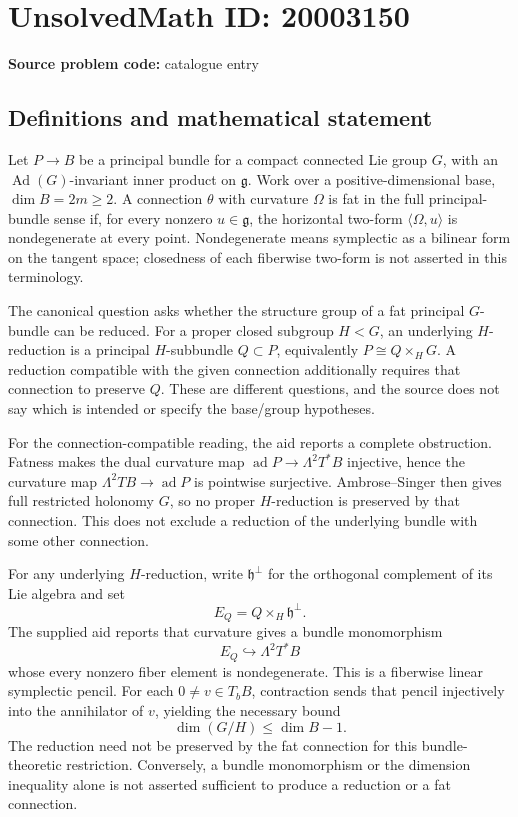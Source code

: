 \documentclass[11pt]{article}
\begin{document}
\section*{UnsolvedMath ID: 20003150}
\textbf{Source problem code:} catalogue entry
\subsection{Definitions and mathematical statement}
Let $P\to B$ be a principal bundle for a compact connected Lie group $G$, with an $\operatorname{Ad}(G)$-invariant inner product on $\mathfrak g$. Work over a positive-dimensional base, $\dim B=2m\geq2$. A connection $\theta$ with curvature $\Omega$ is fat in the full principal-bundle sense if, for every nonzero $u\in\mathfrak g$, the horizontal two-form $\langle\Omega,u\rangle$ is nondegenerate at every point. Nondegenerate means symplectic as a bilinear form on the tangent space; closedness of each fiberwise two-form is not asserted in this terminology.

The canonical question asks whether the structure group of a fat principal $G$-bundle can be reduced. For a proper closed subgroup $H<G$, an underlying $H$-reduction is a principal $H$-subbundle $Q\subset P$, equivalently $P\cong Q\times_HG$. A reduction compatible with the given connection additionally requires that connection to preserve $Q$. These are different questions, and the source does not say which is intended or specify the base/group hypotheses.

For the connection-compatible reading, the aid reports a complete obstruction. Fatness makes the dual curvature map $\operatorname{ad}P\to\Lambda^2T^*B$ injective, hence the curvature map $\Lambda^2TB\to\operatorname{ad}P$ is pointwise surjective. Ambrose--Singer then gives full restricted holonomy $G$, so no proper $H$-reduction is preserved by that connection. This does not exclude a reduction of the underlying bundle with some other connection.

For any underlying $H$-reduction, write $\mathfrak h^\perp$ for the orthogonal complement of its Lie algebra and set
\[
 E_Q=Q\times_H\mathfrak h^\perp.
\]
The supplied aid reports that curvature gives a bundle monomorphism
\[
 E_Q\hookrightarrow\Lambda^2T^*B
\]
whose every nonzero fiber element is nondegenerate. This is a fiberwise linear symplectic pencil. For each $0\ne v\in T_bB$, contraction sends that pencil injectively into the annihilator of $v$, yielding the necessary bound
\[
 \dim(G/H)\leq\dim B-1.
\]
The reduction need not be preserved by the fat connection for this bundle-theoretic restriction. Conversely, a bundle monomorphism or the dimension inequality alone is not asserted sufficient to produce a reduction or a fat connection.
\end{document}
